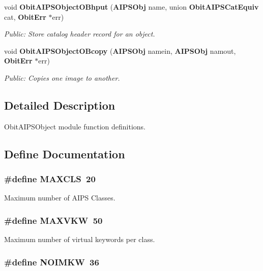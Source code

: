 \begin{CompactItemize}
void {\bf Obit\-AIPSObject\-OBhput} ({\bf AIPSObj} name, union {\bf Obit\-AIPSCat\-Equiv} cat, {\bf Obit\-Err} $\ast$err)
\begin{CompactList}\small\item\em Public: Store catalog header record for an object. \item\end{CompactList}\item 
void {\bf Obit\-AIPSObject\-OBcopy} ({\bf AIPSObj} namein, {\bf AIPSObj} namout, {\bf Obit\-Err} $\ast$err)
\begin{CompactList}\small\item\em Public: Copies one image to another. \item\end{CompactList}\end{CompactItemize}


\subsection{Detailed Description}
Obit\-AIPSObject module function definitions. 



\subsection{Define Documentation}
\subsubsection{\setlength{\rightskip}{0pt plus 5cm}\#define MAXCLS\ 20}\label{ObitAIPSObject_8c_a0}


Maximum number of AIPS Classes. 

\subsubsection{\setlength{\rightskip}{0pt plus 5cm}\#define MAXVKW\ 50}\label{ObitAIPSObject_8c_a1}


Maximum number of virtual keywords per class. 

\subsubsection{\setlength{\rightskip}{0pt plus 5cm}\#define NOIMKW\ 36}\label{ObitAIPSObject_8c_a2}



